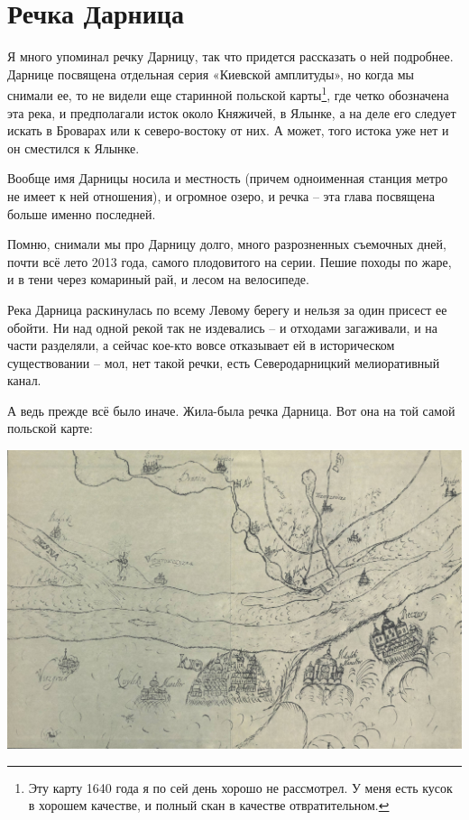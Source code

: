 \chapter{Речка Дарница}

Я много упоминал речку Дарницу, так что придется рассказать о ней подробнее. Дарнице посвящена отдельная серия «Киевской амплитуды», но когда мы снимали ее, то не видели еще старинной польской карты\footnote{Эту карту 1640 года я по сей день хорошо не рассмотрел. У меня есть кусок в хорошем качестве, и полный скан в качестве отвратительном.}, где четко обозначена эта река, и предполагали исток около Княжичей, в Ялынке, а на деле его следует искать в Броварах или к северо-востоку от них. А может, того истока уже нет и он сместился к Ялынке.

Вообще имя Дарницы носила и местность (причем одноименная станция метро не имеет к ней  отношения), и огромное озеро, и речка – эта глава посвящена больше именно последней.

Помню, снимали мы про Дарницу долго, много разрозненных съемочных дней, почти всё лето 2013 года, самого плодовитого на серии. Пешие походы по жаре, и в тени через комариный рай, и лесом на велосипеде.

Река Дарница раскинулась по всему Левому берегу и нельзя за один присест ее обойти. Ни над одной рекой так не издевались – и отходами загаживали, и на части разделяли, а сейчас кое-кто вовсе отказывает ей в историческом существовании – мол, нет такой речки, есть Северодарницкий мелиоративный канал.

А ведь прежде всё было иначе. Жила-была речка Дарница. Вот она на той самой польской карте:

\begin{center}
\includegraphics[width=\linewidth]{chast-gorodki/darn/s_1992-kroynika.jpg}
\end{center}

